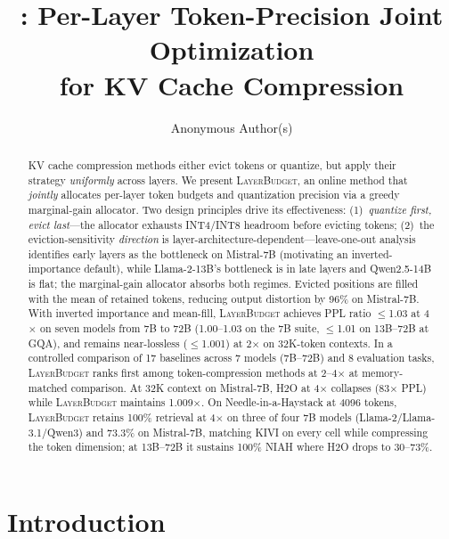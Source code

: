 \documentclass{article}
\title{\layerbudget: Per-Layer Token-Precision Joint Optimization\\for KV Cache Compression}
\author{
  Anonymous Author(s)
}
\newcommand{\layerbudget}{\textsc{LayerBudget}\xspace}
\begin{document}
\maketitle

\begin{abstract}
KV cache compression methods either evict tokens or quantize, but apply their strategy \emph{uniformly} across layers.
We present \layerbudget, an online method that \emph{jointly} allocates per-layer token budgets and quantization precision via a greedy marginal-gain allocator.
Two design principles drive its effectiveness: (1)~\emph{quantize first, evict last}---the allocator exhausts INT4/INT8 headroom before evicting tokens; (2)~the eviction-sensitivity \emph{direction} is layer-architecture-dependent---leave-one-out analysis identifies early layers as the bottleneck on Mistral-7B (motivating an inverted-importance default), while Llama-2-13B's bottleneck is in late layers and Qwen2.5-14B is flat; the marginal-gain allocator absorbs both regimes.
Evicted positions are filled with the mean of retained tokens, reducing output distortion by 96\% on Mistral-7B.
With inverted importance and mean-fill, \layerbudget achieves PPL ratio $\leq$1.03 at 4$\times$ on seven models from 7B to 72B (1.00--1.03 on the 7B suite, $\leq$1.01 on 13B--72B at GQA), and remains near-lossless ($\leq$1.001) at 2$\times$ on 32K-token contexts.
In a controlled comparison of 17 baselines across 7 models (7B--72B) and 8 evaluation tasks, \layerbudget ranks first among token-compression methods at 2--4$\times$ at memory-matched comparison.
At 32K context on Mistral-7B, H2O at 4$\times$ collapses (83$\times$ PPL) while \layerbudget maintains 1.009$\times$.
On Needle-in-a-Haystack at 4096 tokens, \layerbudget retains 100\% retrieval at 4$\times$ on three of four 7B models (Llama-2/Llama-3.1/Qwen3) and 73.3\% on Mistral-7B, matching KIVI on every cell while compressing the token dimension; at 13B--72B it sustains 100\% NIAH where H2O drops to 30--73\%.
\end{abstract}

\section{Introduction}
\label{sec:intro}
\end{document}
